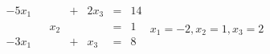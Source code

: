 {$\begin{array}{*{7}{r}}
-5x_1&&&+&2x_3&=&14\\
&&x_2&&&=&1\\
-3x_1&&&+&x_3&=&8\\
\end{array}$}
{$x_1=-2,x_2=1,x_3=2$}
